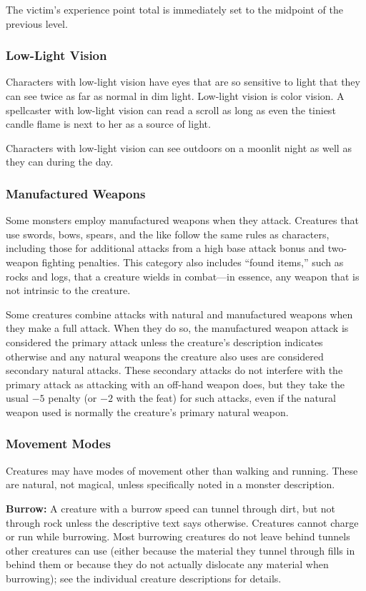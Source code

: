 The victim's experience point total is immediately set to the midpoint of the previous level.

\subsubsection{Low-Light Vision}
Characters with low-light vision have eyes that are so sensitive to light that they can see twice as far as normal in dim light. Low-light vision is color vision. A spellcaster with low-light vision can read a scroll as long as even the tiniest candle flame is next to her as a source of light.

Characters with low-light vision can see outdoors on a moonlit night as well as they can during the day.

\subsubsection{Manufactured Weapons}
Some monsters employ manufactured weapons when they attack. Creatures that use swords, bows, spears, and the like follow the same rules as characters, including those for additional attacks from a high base attack bonus and two-weapon fighting penalties. This category also includes ``found items,'' such as rocks and logs, that a creature wields in combat---in essence, any weapon that is not intrinsic to the creature.

Some creatures combine attacks with natural and manufactured weapons when they make a full attack. When they do so, the manufactured weapon attack is considered the primary attack unless the creature's description indicates otherwise and any natural weapons the creature also uses are considered secondary natural attacks. These secondary attacks do not interfere with the primary attack as attacking with an off-hand weapon does, but they take the usual $-5$ penalty (or $-2$ with the  feat) for such attacks, even if the natural weapon used is normally the creature's primary natural weapon.

\subsubsection{Movement Modes}
Creatures may have modes of movement other than walking and running. These are natural, not magical, unless specifically noted in a monster description.

\textbf{Burrow:} A creature with a burrow speed can tunnel through dirt, but not through rock unless the descriptive text says otherwise. Creatures cannot charge or run while burrowing. Most burrowing creatures do not leave behind tunnels other creatures can use (either because the material they tunnel through fills in behind them or because they do not actually dislocate any material when burrowing); see the individual creature descriptions for details.


